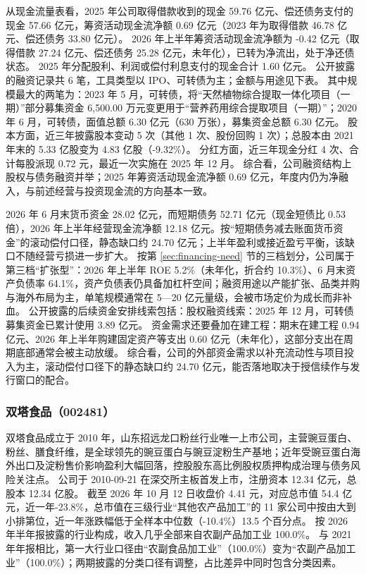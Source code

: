 从现金流量表看，2025 年公司取得借款收到的现金 59.76 亿元、偿还债务支付的现金 57.66 亿元，筹资活动现金流净额 0.69 亿元（2023 年为取得借款 46.78 亿元、偿还债务 33.80 亿元）。 2026 年上半年筹资活动现金流净额为 -0.42 亿元（取得借款 27.24 亿元、偿还债务 25.28 亿元，未年化），已转为净流出，处于净还债状态。 2025 年分配股利、利润或偿付利息支付的现金合计 1.60 亿元。 公开披露的融资记录共 6 笔，工具类型以 IPO、可转债为主；金额与用途见下表。 其中规模最大的两笔为：2023 年 5 月，可转债，将“天然植物综合提取一体化项目（一期）”部分募集资金 6,500.00 万元变更用于“营养药用综合提取项目（一期）”；2020 年 6 月，可转债，面值总额 6.30 亿元（630 万张），募集资金总额 6.30 亿元。 股本方面，近三年披露股本变动 5 次（其他 1 次、股份回购 1 次）；总股本由 2021 年末的 5.33 亿股变为 4.83 亿股（-9.32\%）。 分红方面，近三年现金分红 4 次、合计每股派现 0.72 元，最近一次实施在 2025 年 12 月。 综合看，公司融资结构上股权与债务融资并举；2025 年筹资活动现金流净额 0.69 亿元，年度内仍为净融入，与前述经营与投资现金流的方向基本一致。

 2026 年 6 月末货币资金 28.02 亿元，而短期债务 52.71 亿元（现金短债比 0.53 倍），2026 年上半年经营现金流净额 12.18 亿元。按“短期债务减去账面货币资金”的滚动偿付口径，静态缺口约 24.70 亿元；上半年盈利或接近盈亏平衡，该缺口不随经营亏损进一步扩大。 按第 \ref{sec:financing-need} 节的三档划分，公司属于第三档“扩张型”：2026 年上半年 ROE 5.2\%（未年化，折合约 10.3\%）、6 月末资产负债率 64.1\%，资产负债表仍具备加杠杆空间；融资用途以产能扩张、品类并购与海外布局为主，单笔规模通常在 5---20 亿元量级，会被市场定价为成长而非补血。 公开披露的后续资金安排线索包括：股权融资线索：2025 年 12 月，可转债募集资金已累计使用 3.89 亿元。 资金需求还要叠加在建工程：期末在建工程 0.94 亿元、2026 年上半年购建固定资产等支出 0.60 亿元（未年化），这部分支出在周期底部通常会被主动放缓。 综合看，公司的外部资金需求以补充流动性与项目投入为主，滚动偿付口径下的静态缺口约 24.70 亿元，能否落地取决于授信续作与发行窗口的配合。




\subsubsection{双塔食品（002481）}
\label{co:002481}

 双塔食品成立于 2010 年，山东招远龙口粉丝行业唯一上市公司，主营豌豆蛋白、粉丝、膳食纤维，是全球领先的豌豆蛋白与豌豆淀粉生产基地；近年受豌豆蛋白海外出口及淀粉售价影响盈利大幅回落，控股股东高比例股权质押构成治理与债务风险关注点。 公司于 2010-09-21 在深交所主板首发上市，注册资本 12.34 亿元，总股本 12.34 亿股。 截至 2026 年 10 月 12 日收盘价 4.41 元，对应总市值 54.4 亿元，近一年-23.8\%，总市值在三级行业“其他农产品加工”的 11 家公司中按由大到小排第位，近一年涨跌幅低于全样本中位数（-10.4\%）13.5 个百分点。 按 2026 年半年报披露的行业构成，收入几乎全部来自农副产品加工业 100.0\%。 与 2021 年年报相比，第一大行业口径由“农副食品加工业”（100.0\%）变为“农副产品加工业”（100.0\%）；两期披露的分类口径有调整，占比差异中同时包含分类因素。

